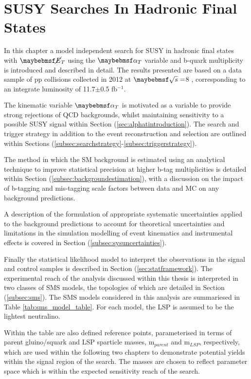 \chapter{SUSY Searches In Hadronic Final States}
\label{chap:SUSYsearches}

In this chapter a model independent search for \ac{SUSY} in hadronic final states with $\met$ using the $\alphat$ variable and b-quark multiplicity is introduced and described in detail. The results presented are based on a data sample of pp collisions collected in 2012 at $\com =$8 \TeV, corresponding to an integrate luminosity of 11.7$\pm$0.5 fb$^{-1}$.

The kinematic variable $\alphat$ is motivated as a variable to provide strong rejections of QCD backgrounds, whilst maintaining sensitivity to a possible \ac{SUSY} signal within Section (\ref{sec:alphatintroduction}). The search and trigger strategy in addition to the event reconstruction and selection are outlined within Sections (\ref{subsec:searchstrategy}-\ref{subsec:triggerstrategy}). 

The method in which the \ac{SM} background is estimated using an analytical technique to improve statistical precision at higher b-tag multiplicities is detailed within Section (\ref{subsec:backgroundestimation}), with a discussion on the impact of b-tagging and mis-tagging scale factors between data and MC on any background predictions. 

A description of the formulation of appropriate systematic uncertainties applied to the background predictions to account for theoretical uncertainties and limitations in the simulation modelling of event kinematics and instrumental effects is covered in Section (\ref{subsec:sysuncertainties}).

Finally the statistical likelihood model to interpret the observations in the signal and control samples is described in Section (\ref{sec:statframework}). The experimental reach of the analysis discussed within this thesis is interpreted in two classes of \ac{SMS} models, the topologies of which are detailed in Section (\ref{subsec:sms}). The \ac{SMS} models considered in this analysis are summariesed in Table \ref{tab:sms_model_table}. For each model, the \ac{LSP} is assumed to be the lightest neutralino. 

Within the table are also defined reference points, parameterised in terms of parent gluino/squark and \ac{LSP} sparticle masses, m$_{parent}$ and m$_{LSP}$, respectively, which are used within the following two chapters to demonstrate potential yields within the signal region of the search. The masses are chosen to reflect parameter space which is within the expected sensitivity reach of the search.

